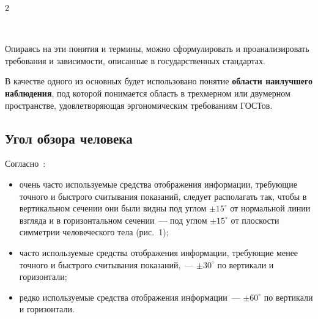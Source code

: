 \begin{multicols}{2}
\begin{figure*}[b] %
\begin{center}
\mbox{%
\epsfxsize=149.148mm
}
\end{center}
\vspace*{-6pt}
\end{figure*}

     Опираясь на эти понятия и термины, можно сформулировать и 
проанализировать требования и зависимости, описанные в государственных 
стандартах.
     
     В качестве одного из основных будет использовано понятие 
\textbf{области наилучшего наблюдения}, под которой понимается область 
в трехмерном или двумерном пространстве, удовлетворяющая 
эргономическим требованиям ГОСТов.
    

\subsection{Угол обзора человека} %

Согласно~\cite{13chu, 14chu}:
\begin{itemize}
\item очень часто используемые средства отображения информации, 
требующие точного и быст\-ро\-го считывания показаний, следует 
располагать так, чтобы в вертикальном сечении они были видны под 
углом $\pm 15^\circ$ от нормальной линии взгляда и в горизонтальном 
сечении~--- под углом $\pm 15^\circ$ от плоскости симметрии 
человеческого тела (рис.~1);
\item часто используемые средства отображения информации, 
требующие менее точного и быстрого считывания показаний,~--- 
$\pm30^\circ$ по вертикали и горизонтали;
\item редко используемые средства отображения информации~--- $\pm 
60^\circ$ по вертикали и горизонтали.
\end{itemize}




\end{multicols}
